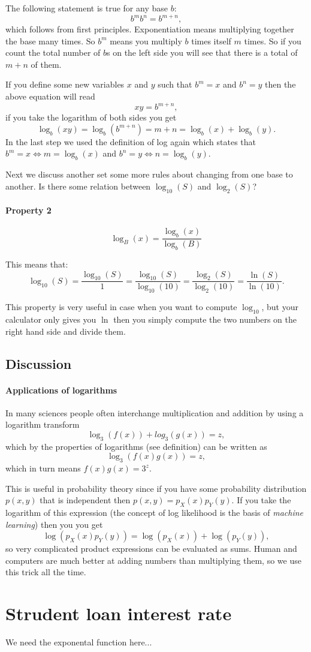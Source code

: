 \documentclass[twocolumn,8pt]{extarticle}
\newcommand{\dokutitleleveltree}[1]{\subsection{#1}}
\newcommand{\dokutitlelevelfive}[1]{\paragraph{#1}}
\newcommand{\dokuitalic}[1]{\textsl{#1}}
\begin{document}
The following statement is true for any base \(b\):
\[
   b^m b^n = b^{m+n},
\]
which follows from first principles. 
Exponentiation means multiplying together the base many times.
So \(b^m\) means you multiply \(b\) times itself \(m\) times. So if you
count the total number of \(b\)s on the left side you will see that
there is a total of \(m+n\) of them.

If you define some new variables \(x\) and \(y\) such that
\(b^m=x\) and \(b^n=y\) then the above equation will read 
\[
  xy = b^{m+n},
\]
if you take the logarithm of both sides you get
\[
  \log_b(xy) = \log_b\left(  b^{m+n} \right) = m + n = \log_b(x) + \log_b(y).
\]
In the last step we used the definition of log again which
states that \(b^m=x \Leftrightarrow m=\log_b(x)\) and \(b^n=y \Leftrightarrow n=\log_b(y)\).


Next we discuss another set some more rules about changing from
one base to another. 
Is there some relation between \(\log_{10}(S)\) and \(\log_2(S)\)?


\dokutitlelevelfive{Property 2}

\[
  \log_{B}(x) =  \frac{\log_b(x)}{\log_b(B)}
\]




This means that:
\[
 \log_{10}(S) 
 =\frac{\log_{10}(S)}{1}
 =\frac{\log_{10}(S)}{\log_{10}(10)} 
 = \frac{\log_{2}(S)}{\log_{2}(10)}=\frac{\ln(S)}{\ln(10)}.
\]

This property is very useful in case when you want to compute 
\(\log_{10}\), but your calculator only gives you \(\ln\) then you simply compute the 
two numbers on the right hand side and divide them.


\dokutitleleveltree{Discussion}
\label{bd8bc36eb41bc90c585ae7e902e9e284}%

\dokutitlelevelfive{Applications of logarithms}

In many sciences people often interchange multiplication and addition 
by using a logarithm transform
\[
  \log_3(f(x)) + log_3(g(x)) = z,
\]
which by the properties of logarithms (see definition) can be written as  
\[
  \log_3(f(x)g(x)) = z,
\]
which in turn means \(f(x)g(x)=3^z\).

This is useful in probability theory since if you have some probability distribution \(p(x,y)\) that is independent then \(p(x,y)=p_X(x)p_Y(y)\). If you take the logarithm of this expression (the concept of log likelihood is the basis of \dokuitalic{machine learning}) then you
you get
\[
  \log(p_X(x)p_Y(y)) = \log(p_X(x)) + \log(p_Y(y)),
\]
so very complicated product expressions can be evaluated as sums.
Human and computers are much better at adding numbers 
than multiplying them, so we use this trick all the time.




\section{Strudent loan interest rate}

We need the exponental function here...






%
%
\end{document}
